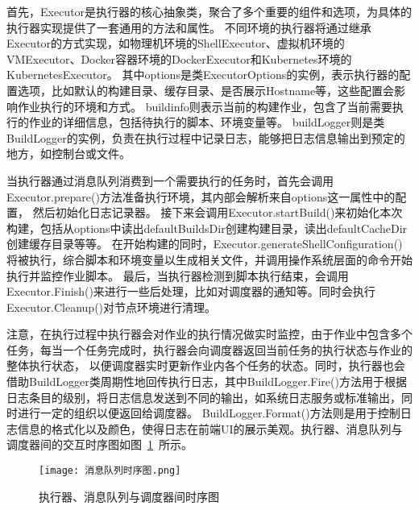 首先，Executor是执行器的核心抽象类，聚合了多个重要的组件和选项，为具体的执行器实现提供了一套通用的方法和属性。
不同环境的执行器将通过继承Executor的方式实现，如物理机环境的ShellExecutor、虚拟机环境的VMExecutor、Docker容器环境的DockerExecutor和Kubernetes环境的KubernetesExecutor。
其中options是类ExecutorOptions的实例，表示执行器的配置选项，比如默认的构建目录、缓存目录、是否展示Hostname等，这些配置会影响作业执行的环境和方式。
buildinfo则表示当前的构建作业，包含了当前需要执行的作业的详细信息，包括待执行的脚本、环境变量等。
buildLogger则是类BuildLogger的实例，负责在执行过程中记录日志，能够把日志信息输出到预定的地方，如控制台或文件。

当执行器通过消息队列消费到一个需要执行的任务时，首先会调用Executor.prepare()方法准备执行环境，其内部会解析来自options这一属性中的配置，
然后初始化日志记录器。
接下来会调用Executor.startBuild()来初始化本次构建，包括从options中读出defaultBuildsDir创建构建目录，读出defaultCacheDir创建缓存目录等等。
在开始构建的同时，Executor.generateShellConfiguration()将被执行，综合脚本和环境变量以生成相关文件，并调用操作系统层面的命令开始执行并监控作业脚本。
最后，当执行器检测到脚本执行结束，会调用Executor.Finish()来进行一些后处理，比如对调度器的通知等。同时会执行Executor.Cleanup()对节点环境进行清理。

注意，在执行过程中执行器会对作业的执行情况做实时监控，由于作业中包含多个任务，每当一个任务完成时，执行器会向调度器返回当前任务的执行状态与作业的整体执行状态，
以便调度器实时更新作业内各个任务的状态。同时，执行器也会借助BuildLogger类周期性地回传执行日志，其中BuildLogger.Fire()方法用于根据日志条目的级别，将日志信息发送到不同的输出，如系统日志服务或标准输出，同时进行一定的组织以便返回给调度器。
BuildLogger.Format()方法则是用于控制日志信息的格式化以及颜色，使得日志在前端UI的展示美观。执行器、消息队列与调度器间的交互时序图如图~\ref{fig:执行器、消息队列与调度器间时序图}~所示。

\begin{figure}[h]
  \centering
  \texttt{[image: 消息队列时序图.png]}
  \caption{执行器、消息队列与调度器间时序图}
  \label{fig:执行器、消息队列与调度器间时序图}
\end{figure}


